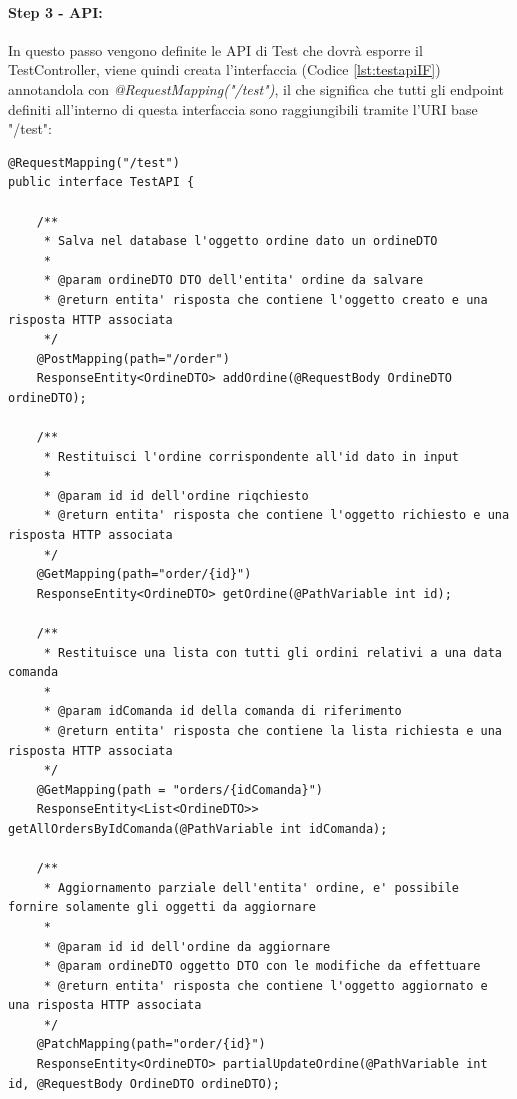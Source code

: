 \paragraph{Step 3 - API:}
In questo passo vengono definite le API di Test che dovrà esporre il TestController, viene quindi creata l'interfaccia (Codice \vref{lst:testapiIF}) annotandola con \textit{@RequestMapping("/test")}, il che significa che tutti gli endpoint definiti all'interno di questa interfaccia sono raggiungibili tramite l'URI base "/test":
\begin{lstlisting}[style=myJava, 
    caption={Interfaccia TestAPI.java}, label=lst:testapiIF, 
    emph={[2] },
    emphstyle={[2]\color{codeDarkMagenta}},
    emph={[3] addOrdine, getOrdine, getAllOrdersByIdComanda, partialUpdateOrdine, deleteOrder, sendOrderEvent, getMessageFromTopicSendOrderEvent, sendNotifyOrderEvent, getMessageFromTopicNotifyOrderEvent, sendNotifyPrepEvent, getMessageFromTopicNotifyPrepEvent },
    emphstyle={[3]\color{codeCyan}},]
@RequestMapping("/test")
public interface TestAPI {

    /**
     * Salva nel database l'oggetto ordine dato un ordineDTO
     *
     * @param ordineDTO DTO dell'entita' ordine da salvare
     * @return entita' risposta che contiene l'oggetto creato e una risposta HTTP associata
     */
    @PostMapping(path="/order")
    ResponseEntity<OrdineDTO> addOrdine(@RequestBody OrdineDTO ordineDTO);

    /**
     * Restituisci l'ordine corrispondente all'id dato in input
     *
     * @param id id dell'ordine riqchiesto
     * @return entita' risposta che contiene l'oggetto richiesto e una risposta HTTP associata
     */
    @GetMapping(path="order/{id}")
    ResponseEntity<OrdineDTO> getOrdine(@PathVariable int id);

    /**
     * Restituisce una lista con tutti gli ordini relativi a una data comanda
     *
     * @param idComanda id della comanda di riferimento
     * @return entita' risposta che contiene la lista richiesta e una risposta HTTP associata
     */
    @GetMapping(path = "orders/{idComanda}")
    ResponseEntity<List<OrdineDTO>> getAllOrdersByIdComanda(@PathVariable int idComanda);

    /**
     * Aggiornamento parziale dell'entita' ordine, e' possibile fornire solamente gli oggetti da aggiornare
     *
     * @param id id dell'ordine da aggiornare
     * @param ordineDTO oggetto DTO con le modifiche da effettuare
     * @return entita' risposta che contiene l'oggetto aggiornato e una risposta HTTP associata
     */
    @PatchMapping(path="order/{id}")
    ResponseEntity<OrdineDTO> partialUpdateOrdine(@PathVariable int id, @RequestBody OrdineDTO ordineDTO);


\end{lstlisting}
